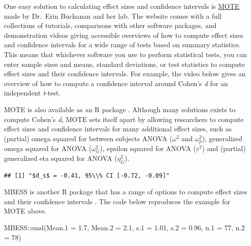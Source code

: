 \documentclass[
  oneside]{book}
\newenvironment{Shaded}{\begin{snugshade}}{\end{snugshade}}
\newcommand{\AttributeTok}[1]{\textcolor[rgb]{0.77,0.63,0.00}{#1}}
\newcommand{\DecValTok}[1]{\textcolor[rgb]{0.00,0.00,0.81}{#1}}
\newcommand{\FloatTok}[1]{\textcolor[rgb]{0.00,0.00,0.81}{#1}}
\newcommand{\FunctionTok}[1]{\textcolor[rgb]{0.00,0.00,0.00}{#1}}
\newcommand{\NormalTok}[1]{#1}
\newcommand{\SpecialCharTok}[1]{\textcolor[rgb]{0.00,0.00,0.00}{#1}}
\begin{document}
One easy solution to calculating effect sizes and confidence intervals is \href{https://www.aggieerin.com/shiny-server/}{MOTE} made by Dr.~Erin Buchanan and her lab. The website comes with a full collections of tutorials, comparisons with other software packages, and demonstration videos giving accessible overviews of how to compute effect sizes and confidence intervals for a wide range of tests based on summary statistics. This means that whichever software you use to perform statistical tests, you can enter sample sizes and means, standard deviations, or test statistics to compute effect sizes and their confidence intervals. For example, the video below gives an overview of how to compute a confidence interval around Cohen's \emph{d} for an independent \emph{t}-test.

MOTE is also available as an R package \citep{buchanan_mote_2017}. Although many solutions exists to compute Cohen's \emph{d}, MOTE sets itself apart by allowing researchers to compute effect sizes and confidence intervals for many additional effect sizes, such as (partial) omega squared for between subjects ANOVA (\(\omega^{2}\) and \(\omega^{2}_p\)), generalized omega squared for ANOVA (\(\omega^{2}_G\)), epsilon squared for ANOVA (\(\varepsilon^{2}\)) and (partial) generalized eta squared for ANOVA (\(\eta^{2}_G\)).

\begin{Shaded}
\end{Shaded}

\begin{verbatim}
## [1] "$d_s$ = -0.41, 95\\% CI [-0.72, -0.09]"
\end{verbatim}

MBESS is another R package that has a range of options to compute effect sizes and their confidence intervals \citep{kelley_confidence_2007}. The code below reproduces the example for MOTE above.

\begin{Shaded}
\begin{Highlighting}[]
\NormalTok{MBESS}\SpecialCharTok{::}\FunctionTok{smd}\NormalTok{(}\AttributeTok{Mean.1 =} \FloatTok{1.7}\NormalTok{, }\AttributeTok{Mean.2 =} \FloatTok{2.1}\NormalTok{, }\AttributeTok{s.1 =} \FloatTok{1.01}\NormalTok{, }\AttributeTok{s.2 =} \FloatTok{0.96}\NormalTok{, }\AttributeTok{n.1 =} \DecValTok{77}\NormalTok{, }\AttributeTok{n.2 =} \DecValTok{78}\NormalTok{)}
\end{Highlighting}
\end{Shaded}
\end{document}
